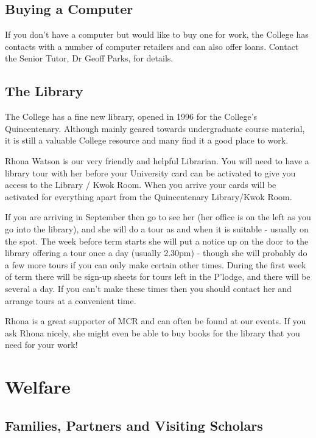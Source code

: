 \documentclass[11pt,fleqn, oneside]{book} %
\begin{document}
\section{Buying a Computer}
   
If you don’t have a computer but would like to buy one for work, the College has contacts with a number of computer retailers and can also offer loans. Contact the Senior Tutor, Dr Geoff Parks, for details. 
   
\section{The Library}
   
The College has a fine new library, opened in 1996 for the College’s Quincentenary. Although mainly geared towards undergraduate course material, it is still a valuable College resource and many find it a good place to work. 
   
Rhona Watson is our very friendly and helpful Librarian.  You will need to have a library tour with her before your University card can be activated to give you access to the Library / Kwok Room.  When you arrive your cards will be activated for everything apart from the Quincentenary Library/Kwok Room.  
   
If you are arriving in September then go to see her (her office is on the left as you go into the library), and she will do a tour as and when it is suitable - usually on the spot.  The week before term starts she will put a notice up on the door to the library offering a tour once a day (usually 2.30pm) - though she will probably do a few more tours if you can only make certain other times.  During the first week of term there will be sign-up sheets for tours left in the P'lodge, and there will be several a day.  If you can't make these times then you should contact her and arrange tours at a convenient time.  
   
Rhona is a great supporter of MCR and can often be found at our events.  If you ask Rhona nicely, she might even be able to buy books for the library that you need for your work!
   
\chapter{Welfare}
   
\section{Families, Partners and Visiting Scholars}
   
\end{document}
